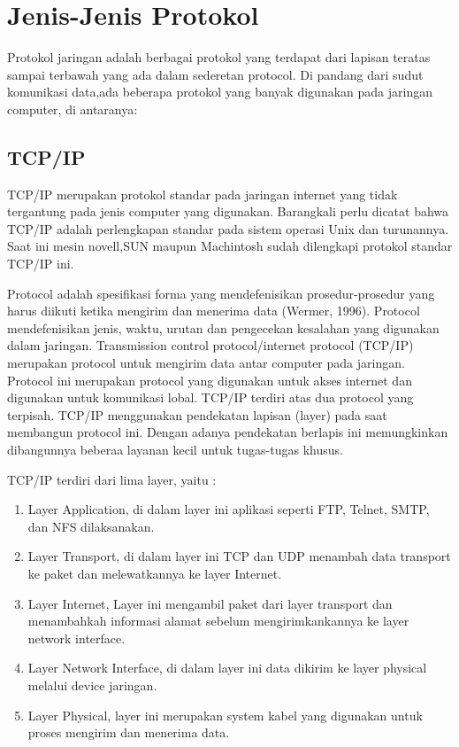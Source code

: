  \section{Jenis-Jenis Protokol}
Protokol jaringan adalah berbagai protokol yang terdapat dari lapisan  teratas sampai terbawah yang ada dalam sederetan protocol.
Di pandang dari sudut komunikasi data,ada beberapa protokol yang banyak digunakan pada jaringan computer, di antaranya:

 \subsection{TCP/IP}
TCP/IP merupakan protokol standar pada jaringan internet yang tidak tergantung pada jenis computer yang digunakan.
Barangkali perlu dicatat bahwa TCP/IP adalah perlengkapan standar pada sistem operasi Unix dan turunannya.
Saat ini mesin novell,SUN maupun Machintosh sudah dilengkapi protokol standar TCP/IP ini.

Protocol adalah spesifikasi forma yang mendefenisikan prosedur-prosedur yang harus diikuti ketika mengirim dan menerima data (Wermer, 
1996). Protocol mendefenisikan jenis, waktu, urutan dan pengecekan kesalahan yang digunakan dalam jaringan. Transmission control 
protocol/internet protocol (TCP/IP) merupakan protocol untuk mengirim data antar computer pada jaringan. Protocol ini merupakan protocol 
yang digunakan untuk akses internet dan digunakan untuk komunikasi lobal. TCP/IP terdiri atas dua protocol yang terpisah. TCP/IP 
menggunakan pendekatan lapisan (layer) pada saat membangun protocol ini. Dengan adanya pendekatan berlapis ini memungkinkan dibangunnya 
beberaa layanan kecil untuk tugas-tugas khusus.

TCP/IP terdiri dari lima layer, yaitu :
\begin{enumerate}
\item   Layer Application, di dalam layer ini aplikasi seperti FTP, Telnet, SMTP, dan NFS dilaksanakan.
\item   Layer Transport, di dalam layer ini TCP dan UDP menambah data transport ke paket dan melewatkannya ke layer Internet.
\item    Layer Internet, Layer ini mengambil paket dari layer transport dan menambahkah informasi alamat sebelum mengirimkankannya ke layer network interface.
\item     Layer Network Interface, di dalam layer ini data dikirim ke layer physical melalui device jaringan.
\item     Layer Physical, layer ini merupakan system kabel yang digunakan untuk proses mengirim dan menerima data.
\end{enumerate}

